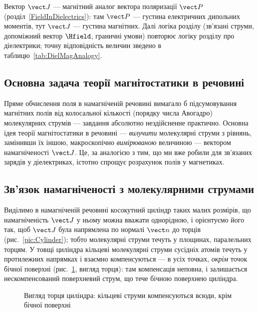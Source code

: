 Вектор $\vect J$ --- магнітний аналог вектора поляризації $\vect P$ (розділ~\ref{FieldInDielectrics}): там $\vect P$ --- густина електричних дипольних моментів, тут $\vect J$ --- густина магнітних. Далі логіка розділу (зв'язані струми, допоміжний вектор $\Hfield$, граничні умови) повторює логіку розділу про діелектрики; точну відповідність величин зведено в таблицю~\ref{tab:DielMagAnalogy}.

\subsection*{Основна задача теорії магнітостатики в речовині}

Пряме обчислення поля в намагніченій речовині вимагало б підсумовування магнітних полів від колосальної кількості (порядку числа Авогадро)
молекулярних струмів --- завдання абсолютно нездійсненне практично. Основна ідея теорії магнітостатики в речовині --- \emph{вилучити} молекулярні
струми з рівнянь, замінивши їх іншою, макроскопічно \emph{вимірюваною} величиною --- вектором намагніченості $\vect J$. Це, за аналогією з тим, що
ми вже робили для зв'язаних зарядів у діелектриках, істотно спрощує розрахунок полів у магнетиках.

\subsection*{Зв'язок намагніченості з молекулярними струмами}

Виділимо в намагніченій речовині косокутний циліндр таких малих розмірів, що намагніченість $\vect J$ у ньому можна вважати однорідною, і орієнтуємо його
так, щоб $\vect J$ була напрямлена по нормалі $\vect n$ до торців (рис.~\ref{pic:Cylinder}); тобто молекулярні струми течуть у площинах, паралельних торцям. У товщі циліндра кільцеві молекулярні струми сусідніх атомів течуть у протилежних напрямках і взаємно компенсуються --- в
усіх точках, \emph{окрім} точок бічної поверхні (рис.~\ref{pic:CylinderTop}, вигляд торця): там компенсація неповна, і залишається нескомпенсований
поверхневий струм, що тече бічною поверхнею циліндра.

\begin{figure}[h!]
	\centering
	\begin{minipage}[t]{0.48\linewidth}\centering
		\caption{Косокутний циліндр у намагніченій речовині}\label{pic:Cylinder}
	\end{minipage}\hfill
	\begin{minipage}[t]{0.48\linewidth}\centering
		\caption{Вигляд торця циліндра: кільцеві струми компенсуються всюди, крім бічної поверхні}\label{pic:CylinderTop}
	\end{minipage}
\end{figure}


